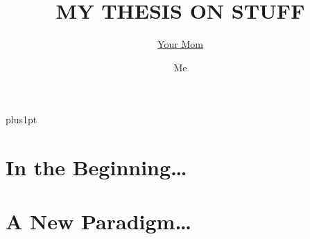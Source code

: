 \documentclass[11pt, openany]{Latex/Classes/PhDthesisPSnPDF}
\title{\MakeUppercase{My Thesis on stuff}}
\author{\href{mailto:your_mom@home.com}{Your Mom}}
\author{Me}
\begin{document}

\renewcommand\baselinestretch{1.2}
\baselineskip=18pt plus1pt



\maketitle  %
\makecopyright %








\setcounter{secnumdepth}{3} %
\setcounter{tocdepth}{3}    %
\tableofcontents            %



\listoftables  %
\listoffigures	%





\mainmatter

	

\part{In the Beginning\ldots}

		
			
\part{A New Paradigm\ldots}
\end{document}
